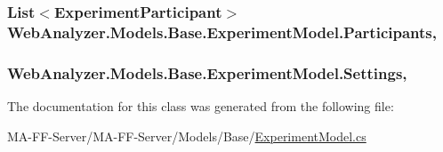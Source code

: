 \subsubsection[{Participants}]{\setlength{\rightskip}{0pt plus 5cm}List$<${\bf Experiment\+Participant}$>$ Web\+Analyzer.\+Models.\+Base.\+Experiment\+Model.\+Participants\hspace{0.3cm}{\ttfamily [get]}, {\ttfamily [set]}}\label{class_web_analyzer_1_1_models_1_1_base_1_1_experiment_model_a2429c903e1bd2b062452cfa648238380}
\hypertarget{class_web_analyzer_1_1_models_1_1_base_1_1_experiment_model_a00e6e2b80147ab73fc0eee0e7c20d856}{}
\subsubsection[{Settings}]{ Web\+Analyzer.\+Models.\+Base.\+Experiment\+Model.\+Settings\hspace{0.3cm}{\ttfamily [get]}, {\ttfamily [set]}}\label{class_web_analyzer_1_1_models_1_1_base_1_1_experiment_model_a00e6e2b80147ab73fc0eee0e7c20d856}


The documentation for this class was generated from the following file\+:\begin{DoxyCompactItemize}
\item 
M\+A-\/\+F\+F-\/\+Server/\+M\+A-\/\+F\+F-\/\+Server/\+Models/\+Base/\hyperlink{_experiment_model_8cs}{Experiment\+Model.\+cs}\end{DoxyCompactItemize}
